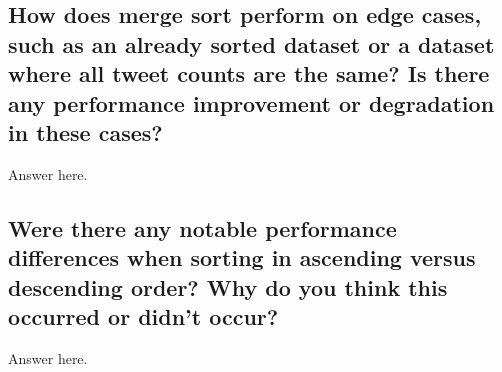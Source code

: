 \subsection*{How does merge sort perform on edge cases, such as an already sorted dataset or a dataset where all tweet counts are the same? Is there any performance improvement or degradation in these cases?}
Answer here. 

\subsection*{Were there any notable performance differences when sorting in ascending versus descending order? Why do you think this occurred or didn’t occur?}
Answer here. 